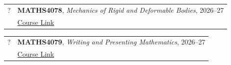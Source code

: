 \documentclass[12pt]{article}
\begin{document}
\begin{itemize}[leftmargin = *]
        \begin{tabularx}{\textwidth}{@{}lX@{}}
            ? & \textbf{MATHS4078}, \textit{Mechanics of Rigid and Deformable Bodies}, 2026--27
            \\
            &
            \href{https://www.gla.ac.uk/coursecatalogue/course/?code=MATHS4078}{Course Link} \\
        \end{tabularx}


        \begin{tabularx}{\textwidth}{@{}lX@{}}
            ? & \textbf{MATHS4079}, \textit{Writing and Presenting Mathematics}, 2026--27
            \\
            &
            \href{https://www.gla.ac.uk/coursecatalogue/course/?code=MATHS4079}{Course Link} \\
        \end{tabularx}

\end{itemize}

\end{document}
